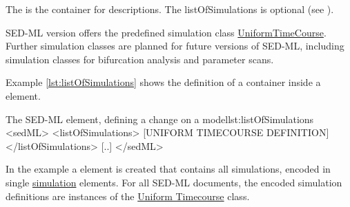 \label{sec:listOfSimulations}

The  is the container for  descriptions. The listOfSimulations is optional (see ).


%

SED-ML version \version offers the predefined simulation class \hyperref[class:uniformTimeCourse]{UniformTimeCourse}. 
Further simulation classes are planned for future versions of SED-ML, including simulation classes for bifurcation analysis and parameter scans. 

Example \ref{lst:listOfSimulations} shows the definition of a  container inside a  element.
\begin{myXmlLst}{The SED-ML  element, defining a change on a model}{lst:listOfSimulations}
<sedML>
 <listOfSimulations>
  [UNIFORM TIMECOURSE DEFINITION]
 </listOfSimulations>
 [..]
</sedML>
\end{myXmlLst}
%
In the example a  element is created that contains all simulations, encoded in single \hyperref[class:simulation]{simulation} elements. For all SED-ML \LoneVone documents, the encoded simulation definitions are instances of the \hyperref[class:timeCourse]{Uniform Timecourse} class.

